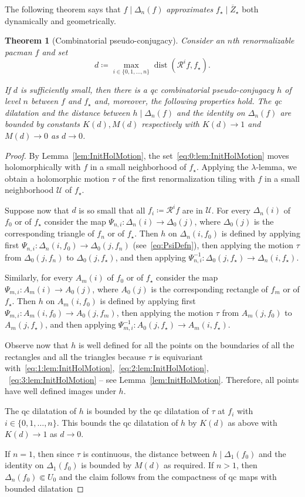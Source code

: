 \documentclass[]{amsart}
\newcommand{\bDelta}{{\mathbb{\Delta}}}
\newcommand\RR{\mathcal{R}}
\newcommand{\str}{{\star}}
\newcommand\UU{\mathcal{U}}
\newtheorem{thm}{Theorem}[section]
\theoremstyle{remark}
\numberwithin{equation}{section}
\theoremstyle{definition}
\newcommand{\dist}{\operatorname{dist}}
\begin{document}
 

The following theorem says that $f\mid \bDelta_n(f)$ \emph{approximates} $f_\str\mid \overline Z_\str$ both dynamically and geometrically.
\begin{thm}[Combinatorial pseudo-conjugacy]
\label{thm:ComPsConj}
Consider an $n$th renormalizable pacman $f$ and set
\[d\coloneqq \max_{i\in\{0,1,\dots, n\}} \dist(\RR^i f,f_\str).\]

If $d$ is sufficiently small, then there is a qc combinatorial pseudo-conjugacy $h$ of level $n$ between $f$ and $f_\str$ and, moreover, the following properties hold. The qc dilatation and the distance between $h\mid \bDelta_n(f)$ and the identity on $\bDelta_n(f)$ are bounded by constants $K(d), M(d)$ respectively with $K(d)\to 1$ and $M(d)\to 0$ as $d\to 0$.
\end{thm}
\begin{proof}
By Lemma~\ref{lem:InitHolMotion}, the set~\eqref{eq:0:lem:InitHolMotion} moves holomorphically with $f$ in a small neighborhood of $f_\str$. Applying the $\lambda$-lemma, we obtain a holomorphic motion $\tau$ of the first renormalization tiling with $f$ in a small neighborhood $\UU$ of $f_\str$.

Suppose now that $d$ is so small that all $f_i\coloneqq \RR^i f$ are in $\UU$. For every $\Delta_n(i)$ of $f_0$ or of $f_\str$ consider the map $ \Psi_{n,i}\colon \Delta_n(i)\to \Delta_0(j)$, where $\Delta_0(j)$ is the corresponding triangle of $f_n$ or of $f_\str$. Then $h$ on $\Delta_n(i,f_0)$ is defined by applying first $\Psi_{n,i}\colon \Delta_n(i,f_0)\to \Delta_0(j,f_n)$ (see~\eqref{eq:PsiDefn}), then applying the motion $\tau$ from $ \Delta_0(j,f_n)$ to $ \Delta_0(j,f_\str)$, and then applying $\Psi_{n,i}^{-1}\colon  \Delta_0(j,f_\str)\to  \Delta_n(i,f_\str)$.

Similarly, for every $A_m(i)$ of $f_0$ or of $f_\str$ consider the map $\Psi_{m,i}\colon A_m(i)\to A_0(j)$, where $A_0(j)$ is the corresponding rectangle of $f_{m}$ or of $f_\str$. Then $h$ on $A_m(i,f_0)$ is defined by applying first $\Psi_{m,i}\colon A_m(i,f_0)\to A_0(j,f_m)$, then applying the motion $\tau$ from $A_m(j,f_0)$ to $A_m(j,f_\str)$, and then applying $\Psi_{m,i}^{-1}\colon  A_0(j,f_\str)\to  A_m(i,f_\str)$. 

Observe now that $h$ is well defined for all the points on the boundaries of all the rectangles and all the triangles because $\tau$ is equivariant with~\eqref{eq:1:lem:InitHolMotion},~\eqref{eq:2:lem:InitHolMotion},
~\eqref{eq:3:lem:InitHolMotion} -- see Lemma~\ref{lem:InitHolMotion}. Therefore, all points have well defined images under $h$.

The qc dilatation of $h$ is bounded by the qc dilatation of $\tau$ at $f_i$ with $i\in\{0,1,\dots, n\}$. This bounds the qc dilatation of $h$ by $K(d)$ as above with $K(d)\to 1$ as $d\to 0$.

If $n=1$, then since $\tau$ is continuous, the distance between  $h\mid \bDelta_1(f_0)$ and the identity on $\bDelta_1(f_0)$ is bounded by $M(d)$ as required. If $n>1$, then $\bDelta_n(f_0)\Subset U_{0}$ and the claim follows from the compactness of qc maps with bounded dilatation
\end{proof}
\end{document}
